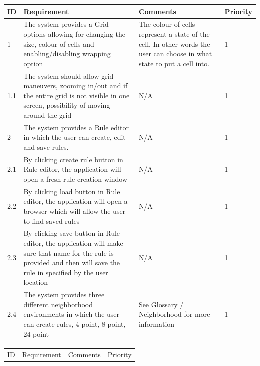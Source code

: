 \documentclass{article}
\begin{document}
\begin{center}
\hspace*{-2.1cm}
	\begin{tabular}{| l | p{7cm} | p{5cm} | l |}
	
		\hline
	  	ID & Requirement & Comments & Priority \\

		\hline
		
		1 & 
		The system provides a Grid options
		allowing for changing the size, colour of cells and
		enabling/disabling wrapping option&
		The colour of cells represent a state of the cell.
		In other words the user can choose in what state to put a cell into. &
		1 
		\\ \hline

		1.1 & 
		The system should allow grid maneuvers, zooming in/out and if the
		entire grid is not visible in one screen, possibility of moving around the grid&
		N/A &
		1 
		\\ \hline

		2 & 
		The system provides a Rule editor in which
		the user can create, edit and save rules. & 
		N/A &
		1 
		\\ \hline
		
		2.1 & 
		By clicking create rule button in Rule editor, the application will open a fresh rule
		creation window & 
		N/A &
		1 
		\\ \hline

		2.2 & 
		By clicking load button in Rule editor, the application will open a browser which
		will allow the user to find saved rules & 
		N/A &
		1 
		\\ \hline

		2.3 & 
		By clicking save button in Rule editor, the application will make sure that name for the
		rule is provided and then will save the rule in specified by the user location & 
		N/A &
		1 
		\\ \hline

		2.4 & 
		The system provides three different neighborhood environments
		in which the user can create rules, 4-point, 8-point, 24-point  & 
		See Glossary / Neighborhood for more information &
		1 
		\\ \hline


	  \hline
	\end{tabular}
\hspace*{-2.1cm}
	\begin{tabular}{| l | p{7cm} | p{5cm} | l |}
	
		\hline
	  	ID & Requirement & Comments & Priority \\


\end{tabular}
\end{center}
\end{document}
